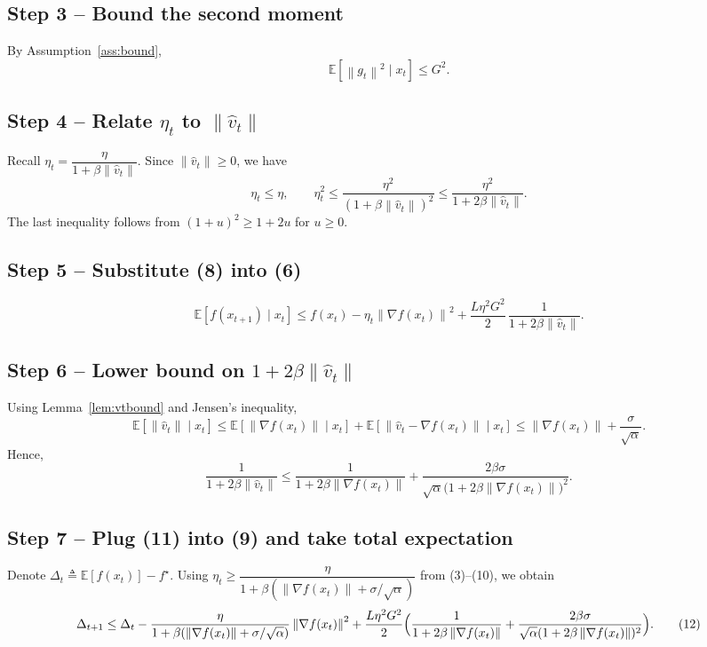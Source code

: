 \documentclass{article}
\newcommand{\EE}{\mathbb{E}}
\newcommand{\norm}[1]{\left\|#1\right\|}
\begin{document}
\subsection*{Step 3 – Bound the second moment}
By Assumption~\ref{ass:bound},
\[
\EE\!\left[\norm{g_t}^{2}\mid x_t\right]\le G^{2}.
\tag{7}
\]

\subsection*{Step 4 – Relate $\eta_t$ to $\norm{\hat v_t}$}
Recall $\eta_t=\dfrac{\eta}{1+\beta\norm{\hat v_t}}$.
Since $\norm{\hat v_t}\ge0$, we have
\[
\eta_t\le\eta,\qquad 
\eta_t^{2}\le\frac{\eta^{2}}{(1+\beta\norm{\hat v_t})^{2}}
\le\frac{\eta^{2}}{1+2\beta\norm{\hat v_t}} .
\tag{8}
\]
The last inequality follows from $(1+u)^{2}\ge1+2u$ for $u\ge0$.

\subsection*{Step 5 – Substitute (8) into (6)}
\[
\EE\!\left[f(x_{t+1})\mid x_t\right]\le
f(x_t)-\eta_t\norm{\nabla f(x_t)}^{2}
+\frac{L\eta^{2}G^{2}}{2}\,\frac{1}{1+2\beta\norm{\hat v_t}} .
\tag{9}
\]

\subsection*{Step 6 – Lower bound on $1+2\beta\norm{\hat v_t}$}
Using Lemma~\ref{lem:vtbound} and Jensen’s inequality,
\[
\EE\!\left[\norm{\hat v_t}\mid x_t\right]
\le\EE\!\left[\norm{\nabla f(x_t)}\mid x_t\right]
      +\EE\!\left[\norm{\hat v_t-\nabla f(x_t)}\mid x_t\right]
\le\norm{\nabla f(x_t)}+\frac{\sigma}{\sqrt{\alpha}} .
\tag{10}
\]
Hence,
\[
\frac{1}{1+2\beta\norm{\hat v_t}}
\le
\frac{1}{1+2\beta\norm{\nabla f(x_t)}}
+\frac{2\beta\sigma}{\sqrt{\alpha}\bigl(1+2\beta\norm{\nabla f(x_t)}\bigr)^{2}} .
\tag{11}
\]

\subsection*{Step 7 – Plug (11) into (9) and take total expectation}
Denote $\Delta_t\triangleq\EE\!\left[f(x_t)\right]-f^\star$.
Using $\eta_t\ge \dfrac{\eta}{1+\beta(\norm{\nabla f(x_t)}+\sigma/\sqrt{\alpha})}$ from (3)–(10), we obtain
\[
\Delta_{t+1}\le
\Delta_t
-\frac{\eta}{1+\beta(\norm{\nabla f(x_t)}+\sigma/\sqrt{\alpha})}\norm{\nabla f(x_t)}^{2}
+\frac{L\eta^{2}G^{2}}{2}\Bigl(
\frac{1}{1+2\beta\norm{\nabla f(x_t)}}
+\frac{2\beta\sigma}{\sqrt{\alpha}(1+2\beta\norm{\nabla f(x_t)})^{2}}
\Bigr).
\tag{12}
\]
\end{document}
